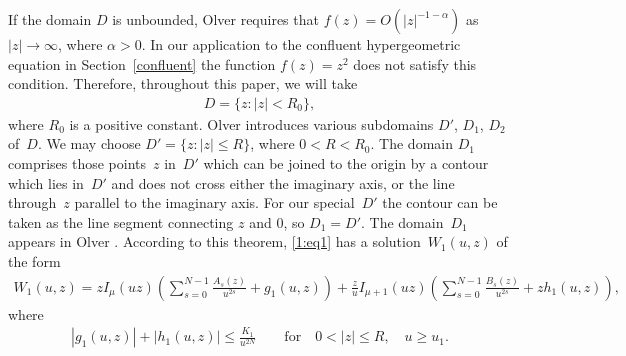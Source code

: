If the domain $D$ is unbounded, Olver \cite[p.~77]{O} requires that $f(z)=O(|z|^{-1-\alpha})$ as $|z|\to\infty$, where $\alpha>0$.
In our application to the conf\/luent hypergeometric equation in Section~\ref{confluent} the function $f(z)=z^2$ does not satisfy this condition.
Therefore, throughout this paper, we will take
\begin{gather}\label{1:D}
 D=\{z\colon |z|<R_0\},
 \end{gather}
where $R_0$ is a positive constant.
Olver \cite[p.~77]{O} introduces various subdomains $D'$, $D_1$, $D_2$ of~$D$.
We may choose $D'=\{z\colon |z|\le R\}$, where $0<R<R_0$. The domain $D_1$ comprises those points~$z$ in~$D'$ which can be joined to the origin by a contour
which lies in~$D'$ and does not cross either the imaginary axis, or the line through~$z$ parallel to the imaginary axis.
For our special~$D'$ the contour can be taken as the line segment connecting $z$ and $0$, so $D_1=D'$. The domain~$D_1$ appears in
Olver \cite[Theorem~D(i)]{O}. According to this theorem, \eqref{1:eq1} has a solu\-tion~$W_1(u,z)$ of the form
\begin{gather}\label{1:W1}
W_1(u,z)=zI_\mu(uz)\left(\sum_{s=0}^{N-1} \frac{A_s(z)}{u^{2s}}+g_1(u,z)\right)
+\frac{z}{u}I_{\mu+1}(uz)\left(\sum_{s=0}^{N-1} \frac{B_s(z)}{u^{2s}}+zh_1(u,z)\right),\!\!\!
\end{gather}
where
\begin{gather}\label{1:W1a}
 |g_1(u,z)|+|h_1(u,z)|\le \frac{K_1}{u^{2N}}\qquad \text{for} \quad 0<|z|\le R,\quad u\ge u_1 .
\end{gather}


